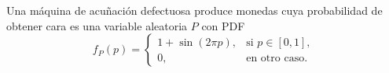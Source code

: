 \documentclass[
  11pt,
  letterpaper,
   addpoints,
  answers
  ]{exam}
\begin{document}
\begin{questions}
%
%
%
%
%
%
%
%
%
%
%
\question Una máquina de acuñación defectuosa produce monedas cuya probabilidad de obtener cara es una variable aleatoria $P$ con PDF
\begin{equation}
f_P(p) = \begin{cases}
1 + \sin(2\pi p), & \text{si } p \in [0,1], \\
0, & \text{en otro caso}.
\end{cases}
\end{equation}


\end{questions}
\end{document}

